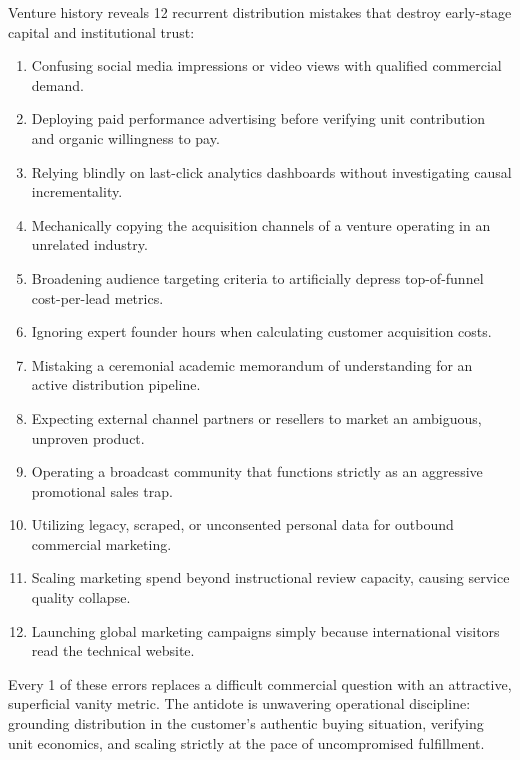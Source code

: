 Venture history reveals 12 recurrent distribution mistakes that destroy early-stage capital and institutional trust:
\begin{enumerate}[leftmargin=*,itemsep=1pt]
  \item Confusing social media impressions or video views with qualified commercial demand.
  \item Deploying paid performance advertising before verifying unit contribution and organic willingness to pay.
  \item Relying blindly on last-click analytics dashboards without investigating causal incrementality.
  \item Mechanically copying the acquisition channels of a venture operating in an unrelated industry.
  \item Broadening audience targeting criteria to artificially depress top-of-funnel cost-per-lead metrics.
  \item Ignoring expert founder hours when calculating customer acquisition costs.
  \item Mistaking a ceremonial academic memorandum of understanding for an active distribution pipeline.
  \item Expecting external channel partners or resellers to market an ambiguous, unproven product.
  \item Operating a broadcast community that functions strictly as an aggressive promotional sales trap.
  \item Utilizing legacy, scraped, or unconsented personal data for outbound commercial marketing.
  \item Scaling marketing spend beyond instructional review capacity, causing service quality collapse.
  \item Launching global marketing campaigns simply because international visitors read the technical website.
\end{enumerate}

Every 1 of these errors replaces a difficult commercial question with an attractive, superficial vanity metric. The antidote is unwavering operational discipline: grounding distribution in the customer's authentic buying situation, verifying unit economics, and scaling strictly at the pace of uncompromised fulfillment.
